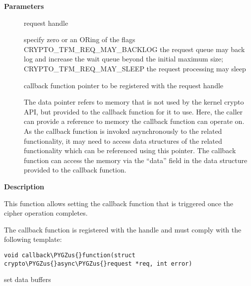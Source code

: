 \documentclass[a4paper,8pt,english]{sphinxmanual}
\def\PYGZus{\char`\_}
\begin{document}
\textbf{Parameters}
\begin{description}
\item[{}] \leavevmode
request handle

\item[{}] \leavevmode
specify zero or an ORing of the flags
CRYPTO\_TFM\_REQ\_MAY\_BACKLOG the request queue may back log and
increase the wait queue beyond the initial maximum size;
CRYPTO\_TFM\_REQ\_MAY\_SLEEP the request processing may sleep

\item[{}] \leavevmode
callback function pointer to be registered with the request handle

\item[{}] \leavevmode
The data pointer refers to memory that is not used by the kernel
crypto API, but provided to the callback function for it to use. Here,
the caller can provide a reference to memory the callback function can
operate on. As the callback function is invoked asynchronously to the
related functionality, it may need to access data structures of the
related functionality which can be referenced using this pointer. The
callback function can access the memory via the ``data'' field in the
 data structure provided to the callback function.

\end{description}

\textbf{Description}

This function allows setting the callback function that is triggered once
the cipher operation completes.

The callback function is registered with the  handle and
must comply with the following template:

\begin{Verbatim}[commandchars=\\\{\}]
void callback\PYGZus{}function(struct crypto\PYGZus{}async\PYGZus{}request *req, int error)
\end{Verbatim}

\begin{fulllineitems}
\label{crypto/api-digest:c.ahash_request_set_crypt}
set data buffers

\end{fulllineitems}
\end{document}
